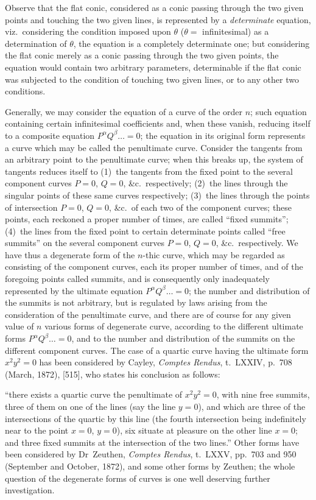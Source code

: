 \documentclass[11pt,a4paper]{book}
\begin{document}
Observe that the flat conic, considered as a conic passing through the two given points and touching the two given lines, is represented by a \textit{determinate} equation, viz.~considering the condition imposed upon $\theta$ ($\theta = $ infinitesimal) as a determination of $\theta$, the equation is a completely determinate one; but considering the flat conic merely as a conic passing through the two given points, the equation would contain two arbitrary parameters, determinable if the flat conic was subjected to the condition of touching two given lines, or to any other two conditions.

Generally, we may consider the equation of a curve of the order $n$; such equation containing certain infinitesimal coefficients and, when these vanish, reducing itself to a composite equation $P^\alpha Q^\beta \ldots = 0$; the equation in its original form represents a curve which may be called the penultimate curve. Consider the tangents from an arbitrary point to the penultimate curve; when this breaks up, the system of tangents reduces itself to (1)~the tangents from the fixed point to the several component curves $P = 0$, $Q = 0$, \&c.\ respectively; (2)~the lines through the singular points of these same curves respectively; (3)~the lines through the points of intersection $P = 0$, $Q = 0$, \&c.\ of each two of the component curves; these points, each reckoned a proper number of times, are called ``fixed summits''; (4)~the lines from the fixed point to certain determinate points called ``free summits'' on the several component curves $P = 0$, $Q = 0$, \&c.\ respectively. We have thus a degenerate form of the $n$-thic curve, which may be regarded as consisting of the component curves, each its proper number of times, and of the foregoing points called summits, and is consequently only inadequately represented by the ultimate equation $P^\alpha Q^\beta \ldots = 0$; the number and distribution of the summits is not arbitrary, but is regulated by laws arising from the consideration of the penultimate curve, and there are of course for any given value of $n$ various forms of degenerate curve, according to the different ultimate forms $P^\alpha Q^\beta \ldots = 0$, and to the number and distribution of the summits on the different component curves. The case of a quartic curve having the ultimate form $x^2y^2 = 0$ has been considered by Cayley, \textit{Comptes Rendus}, t.~LXXIV, p.~708 (March, 1872), [515], who states his conclusion as follows:

``there exists a quartic curve the penultimate of $x^2y^2 = 0$, with nine free summits, three of them on one of the lines (say the line $y = 0$), and which are three of the intersections of the quartic by this line (the fourth intersection being indefinitely near to the point $x = 0$, $y = 0$), six situate at pleasure on the other line $x = 0$; and three fixed summits at the intersection of the two lines.'' Other forms have been considered by Dr~Zeuthen, \textit{Comptes Rendus}, t.~LXXV, pp.~703 and 950 (September and October, 1872), and some other forms by Zeuthen; the whole question of the degenerate forms of curves is one well deserving further investigation.
\end{document}
